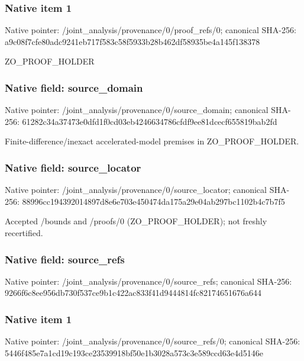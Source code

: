 \documentclass[10pt,a4paper]{article}
\begin{document}
\subsubsection{Native item 1}
Native pointer: /joint\_\allowbreak{}analysis/provenance/0/proof\_\allowbreak{}refs/0; canonical SHA-256: a9c08f7cfe80adc9241eb717f583c58f5933b28b462df58935be4a145f138378

\begingroup\raggedright\sloppy ZO\_\allowbreak{}PROOF\_\allowbreak{}HOLDER\par\endgroup

\subsubsection{Native field: source\_\allowbreak{}domain}
Native pointer: /joint\_\allowbreak{}analysis/provenance/0/source\_\allowbreak{}domain; canonical SHA-256: 61282c34a37473e0dfd1f0cd03eb4246634786cfdf9ee81dcecf655819bab2fd

\begingroup\raggedright\sloppy Finite-difference/\allowbreak{}inexact accelerated-model premises in ZO\_\allowbreak{}PROOF\_\allowbreak{}HOLDER.\par\endgroup

\subsubsection{Native field: source\_\allowbreak{}locator}
Native pointer: /joint\_\allowbreak{}analysis/provenance/0/source\_\allowbreak{}locator; canonical SHA-256: 88996cc194392014897d8e6e703e450474da175a29e04ab297bc1102b4c7b7f5

\begingroup\raggedright\sloppy Accepted /\allowbreak{}bounds and /\allowbreak{}proofs/\allowbreak{}0 (ZO\_\allowbreak{}PROOF\_\allowbreak{}HOLDER);\allowbreak{} not freshly recertified.\par\endgroup

\subsubsection{Native field: source\_\allowbreak{}refs}
Native pointer: /joint\_\allowbreak{}analysis/provenance/0/source\_\allowbreak{}refs; canonical SHA-256: 9266f6c8ee956db730f537ce9b1c422ac833f41d9444814fc82174651676a644

\subsubsection{Native item 1}
Native pointer: /joint\_\allowbreak{}analysis/provenance/0/source\_\allowbreak{}refs/0; canonical SHA-256: 5446f485e7a1cd19c193ce23539918bf50e1b3028a573c3e589ccd63e4d5146e
\end{document}
